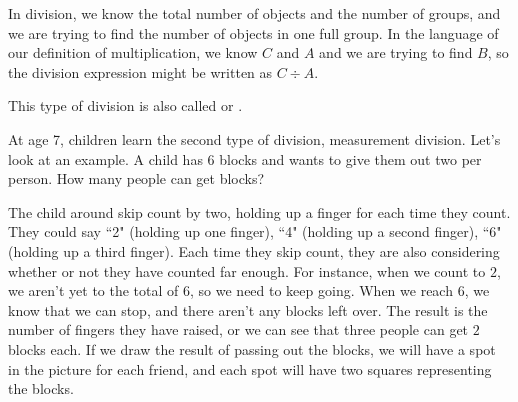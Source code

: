\documentclass{ximera}
\begin{document}
\begin{definition}
In  division, we know the total number of objects and the number of groups, and we are trying to find the number of objects in one full group. In the language of our definition of multiplication, we know $C$ and $A$ and we are trying to find $B$, so the division expression might be written as $C \div A$.
\begin{image}
\end{image}

This type of division is also called  or .
\end{definition}

At age 7, children learn the second type of division, measurement division. Let's look at an example. A child has $6$ blocks and wants to give them out two per person. How many people can get blocks? 

The child around skip count by two, holding up a finger for each time they count. They could say ``2" (holding up one finger), ``4" (holding up a second finger), ``6" (holding up a third finger). Each time they skip count, they are also considering whether or not they have counted far enough. For instance, when we count to $2$, we aren't yet to the total of $6$, so we need to keep going. When we reach $6$, we know that we can stop, and there aren't any blocks left over. The result is the number of fingers they have raised, or we can see that three people can get $2$ blocks each. If we draw the result of passing out the blocks, we will have a spot in the picture for each friend, and each spot will have two squares representing the blocks.
\begin{image}
\end{image}
\end{document}
